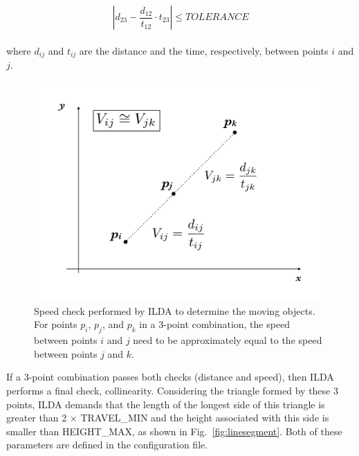 \documentclass[review]{elsarticle}
\begin{document}
\begin{equation}
        \left | {d_{23} - \frac {d_{12}}{t_{12}} \cdot t_{23}} \right | \leq TOLERANCE
\end{equation}
\\
\noindent
where $d_{ij}$ and $t_{ij}$ are the distance and the time, respectively, between points $i$ and $j$.

\begin{figure}[!h]
  \centering
  \includegraphics[width=1.0\textwidth]{figure_3_velocity}
  \caption{Speed check performed by ILDA to determine the moving objects. For points $p_i$, $p_j$, and $p_k$ in a 3-point combination, the speed between points $i$ and $j$ need to be approximately equal to the speed between points $j$ and $k$.}
  \label{fig:velocity}
\end{figure}

If a 3-point combination passes both checks (distance and speed), then ILDA performs a final check, collinearity. Considering the triangle formed by these 3 points, ILDA demands that the length of the longest side of this triangle is greater than 2 $\times$ TRAVEL\_MIN and the height associated with this side is smaller than HEIGHT\_MAX, as shown in Fig.~\ref{fig:linesegment}. Both of these parameters are defined in the configuration file.
\end{document}
